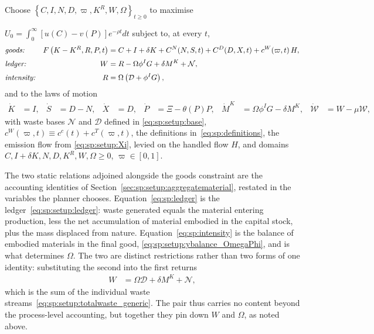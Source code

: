 \begin{problem}\label{prob:sp}
Choose $\left\{C,I,N,D,\varpi,K^R,W,\Omega\right\}_{t\ge0}$ to maximise

\noindent $U_0=\int_0^\infty\left[u(C)-v(P)\right]e^{-\rho t}dt$ subject to, at every $t$,
\begin{align}
&\text{\emph{goods:}}
&
F\left(K-K^R,R,P,t\right) &= C+I+\delta K+C^N(N,S,t)+C^D(D,X,t)+c^W\!\left(\varpi,t\right)H,
\label{eq:sp:goods}
\\[0.2em]
&\text{\emph{ledger:}}
&
W &= R-\Omega\phi^I G+\delta M^K+\mathcal N,
\label{eq:sp:ledger}
\\[0.2em]
&\text{\emph{intensity:}}
&
R &= \Omega\left(\mathcal D+\phi^IG\right),
\label{eq:sp:intensity}
\end{align}
and to the laws of motion
\begin{align}
\dot K &= I,
&
\dot S &= D-N,
&
\dot X &= D,
&
\dot P &= \Xi-\theta(P)P,
&
\dot M^K &= \Omega\phi^I G-\delta M^K,
&
\dot{\mathcal W} &= W-\mu\mathcal W,
\label{eq:sp:states-motion}
\end{align}
with waste bases $\mathcal{N}$ and $\mathcal{D}$ defined in \eqref{eq:sp:setup:base}, $c^W\!\left(\varpi,t\right) \equiv c^c(t)+ c^T(\varpi,t)$, the definitions in~\eqref{eq:sp:definitions}, the emission flow from \eqref{eq:sp:setup:Xi}, levied on the handled flow $H$, and domains $C,I+\delta K,N,D,K^R,W,\Omega\ge0$, $\varpi\in\left[0,1\right]$.
\end{problem}

The two static relations adjoined alongside the goods constraint are the accounting identities of Section~\ref{sec:sp:setup:aggregatematerial}, restated in the variables the planner chooses. Equation~\eqref{eq:sp:ledger} is the ledger~\eqref{eq:sp:setup:ledger}: waste generated equals the material entering production, less the net accumulation of material embodied in the capital stock, plus the mass displaced from nature. Equation~\eqref{eq:sp:intensity} is the balance of embodied materials in the final good, \eqref{eq:sp:setup:ybalance_OmegaPhi}, and is what determines $\Omega$. The two are distinct restrictions rather than two forms of one identity: substituting the second into the first returns
\begin{align}
W &= \Omega\mathcal D+\delta M^K+\mathcal N,
\label{eq:sp:ledger-streams}
\end{align}
which is the sum of the individual waste streams~\eqref{eq:sp:setup:totalwaste_generic}. The pair thus carries no content beyond the process-level accounting, but together they pin down $W$ and $\Omega$, as noted above.

